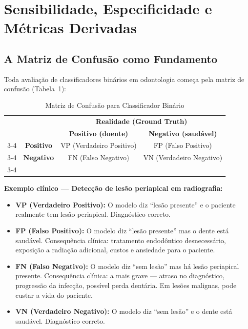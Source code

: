 \section{Sensibilidade, Especificidade e Métricas Derivadas}

\subsection{A Matriz de Confusão como Fundamento}

Toda avaliação de classificadores binários em odontologia começa pela matriz de confusão  (Tabela~\ref{tab:matriz-confusao}):

\begin{table}[H]
  \centering
  \caption{Matriz de Confusão para Classificador Binário}
  \label{tab:matriz-confusao}
  \begin{tabular}{cc|c|c|}
    \multicolumn{2}{c}{} & \multicolumn{2}{c}{\textbf{Realidade (Ground Truth)}} \\
    \multicolumn{2}{c}{} & \textbf{Positivo (doente)} & \textbf{Negativo (saudável)} \\
    \cline{3-4}
    \multirow{2}{*}{\textbf{Predição}} & \textbf{Positivo} & VP (Verdadeiro Positivo) & FP (Falso Positivo) \\
    \cline{3-4}
    & \textbf{Negativo} & FN (Falso Negativo) & VN (Verdadeiro Negativo) \\
    \cline{3-4}
  \end{tabular}
\end{table}

\textbf{Exemplo clínico — Detecção de lesão periapical em radiografia:}
\begin{itemize}
    \item \textbf{VP (Verdadeiro Positivo):} O modelo diz ``lesão presente'' e o paciente realmente tem lesão periapical. Diagnóstico correto.
    \item \textbf{FP (Falso Positivo):} O modelo diz ``lesão presente'' mas o dente está saudável. Consequência clínica: tratamento endodôntico desnecessário, exposição a radiação adicional, custos e ansiedade para o paciente.
    \item \textbf{FN (Falso Negativo):} O modelo diz ``sem lesão'' mas há lesão periapical presente. Consequência clínica: a mais grave — atraso no diagnóstico, progressão da infecção, possível perda dentária. Em lesões malignas, pode custar a vida do paciente.
    \item \textbf{VN (Verdadeiro Negativo):} O modelo diz ``sem lesão'' e o dente está saudável. Diagnóstico correto.
\end{itemize}

